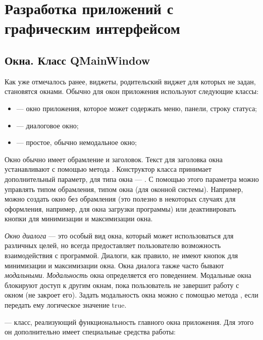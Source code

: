 \chapter[Разработка приложений с графическим интерфейсом]{Разработка приложений с графическим интерфейсом}
\section[Окна. Класс QMainWindow]{Окна. Класс QMainWindow}
Как уже отмечалось ранее, виджеты, родительский виджет для которых не задан, становятся окнами. Обычно для окон
приложения используют следующие классы:

\begin{itemize}
\item {} --- окно приложения, которое может содержать меню, панели,
строку статуса;
\item {} --- диалоговое окно;
\item {} --- простое, обычно немодальное окно;
\end{itemize}
Окно обычно имеет обрамление и заголовок. Текст для заголовка окна устанавливают с помощью метода
. Конструктор класса 
 принимает дополнительный параметр, для типа окна ---
. С помощью этого параметра можно
управлять типом обрамления, типом окна (для оконной системы). Например, можно создать окно без обрамления (это полезно
в некоторых случаях для оформления, например, для окна загрузки программы) или деактивировать кнопки для минимизации и
максимизации окна.

\emph{Окно диалога} --- это особый вид окна, который может использоваться для различных
целей, но всегда предоставляет пользователю возможность взаимодействия с программой. Диалоги, как правило, не имеют
кнопок для минимизации и максимизации окна. Окна диалога также часто бывают
\emph{модальными}.
\emph{Модальность} окна определяется его поведением.
Модальные окна блокируют доступ к другим окнам, пока пользователь не завершит работу с окном (не закроет его). Задать
модальность окна можно с помощью метода , если
передать ему логическое значение true.

 --- класс, реализующий функциональность главного окна приложения. Для этого он дополнительно
имеет специальные средства работы:

